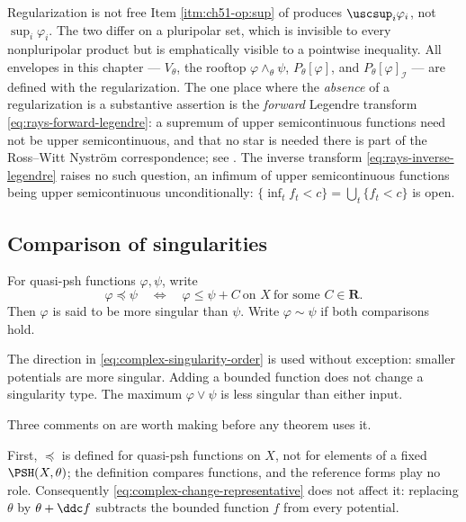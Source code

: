 \begin{warning}{Regularization is not free}
\label{warn:ch51-usc}
Item \cref{itm:ch51-op:sup} of  produces $\uscsup_i\varphi_i$, not
$\sup_i\varphi_i$.  The two differ on a pluripolar set, which is
invisible to every nonpluripolar product but is emphatically visible to a
pointwise inequality.  All envelopes in this chapter --- $V_\theta$, the
rooftop $\varphi\wedge_\theta\psi$, $P_\theta[\varphi]$, and
$P_\theta[\varphi]_{\mathcal I}$ --- are defined with the
regularization.  The one place where the \emph{absence} of a
regularization is a substantive assertion is the \emph{forward} Legendre
transform \eqref{eq:rays-forward-legendre}: a supremum of upper
semicontinuous functions need not be upper semicontinuous, and that no star
is needed there is part of the Ross--Witt Nystr\"om correspondence; see
.  The inverse transform
\eqref{eq:rays-inverse-legendre} raises no such question, an infimum of
upper semicontinuous functions being upper semicontinuous unconditionally:
$\{\inf_tf_t<c\}=\bigcup_t\{f_t<c\}$ is open.
\end{warning}

\subsection{Comparison of singularities}
\label{sec:ch51-ordinary-order}

\begin{definition}
\label{def:complex-singularity-order}
For quasi-psh functions $\varphi,\psi$, write
\[
 \varphi\preceq\psi
 \quad\Longleftrightarrow\quad
 \varphi\leq\psi+C\ \text{on }X\ \text{for some }C\in\mathbf R.
\tag{51.4}\label{eq:complex-singularity-order}
\]
Then $\varphi$ is said to be more singular than $\psi$.
Write $\varphi\sim\psi$ if both comparisons hold.
\end{definition}

The direction in \eqref{eq:complex-singularity-order} is used without
exception: smaller potentials are more singular.  Adding a bounded
function does not change a singularity type.  The maximum
$\varphi\vee\psi$ is less singular than either input.

Three comments on  are worth making
before any theorem uses it.

First, $\preceq$ is defined for quasi-psh functions on $X$, not for
elements of a fixed $\PSH(X,\theta)$; the definition compares functions,
and the reference forms play no role.  Consequently
\eqref{eq:complex-change-representative} does not affect it: replacing
$\theta$ by $\theta+\ddc f$ subtracts the bounded function $f$ from
every potential.


